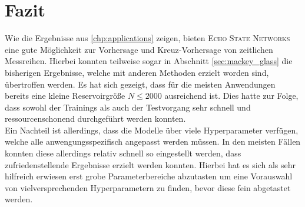 \section{Fazit}
Wie die Ergebnisse aus \ref{chp:applications} zeigen, bieten \textsc{Echo State Networks} eine gute Möglichkeit zur Vorhersage und Kreuz-Vorhersage von zeitlichen Messreihen. Hierbei konnten teilweise sogar in Abschnitt \ref{sec:mackey_glass} die bisherigen Ergebnisse, welche mit anderen Methoden erzielt worden sind, übertroffen werden. Es hat sich gezeigt, dass für die meisten Anwendungen bereits eine kleine Reservoirgröße $N \leq 2000$ ausreichend ist. Dies hatte zur Folge, dass sowohl der Trainings als auch der Testvorgang sehr schnell und ressourcenschonend durchgeführt werden konnten.\\

Ein Nachteil ist allerdings, dass die Modelle über viele Hyperparameter verfügen, welche alle anwengungsspezifisch angepasst werden müssen. In den meisten Fällen konnten diese allerdings relativ schnell so eingestellt werden, dass zufriedenstellende Ergebnisse erzielt werden konnten. Hierbei hat es sich als sehr hilfreich erwiesen erst grobe Parameterbereiche abzutasten um eine Vorauswahl von vielversprechenden Hyperparametern zu finden, bevor diese fein abgetastet werden. 